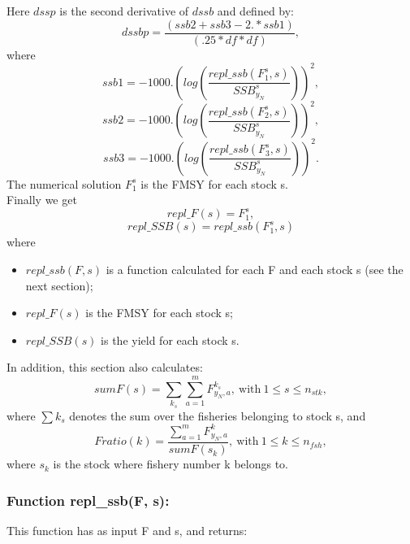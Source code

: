 \documentclass{article}
\begin{document}
Here $dssp$ is the second derivative of $dssb$ and defined by:
\begin{equation}
    dssbp  = \dfrac{(ssb2 + ssb3 - 2.*ssb1)}{(.25*df*df)},
\end{equation}
where
\begin{equation}
    ssb1=-1000.\left(log\left(\dfrac{repl\_ssb(F_1^s,s)}{SSB^s_{y_N}}\right)\right)^2,
\end{equation}
\begin{equation}
    ssb2=-1000.\left(log\left(\dfrac{repl\_ssb(F_2^s,s)}{SSB^s_{y_N}}\right)\right)^2,
\end{equation}
\begin{equation}
    ssb3=-1000.\left(log\left(\dfrac{repl\_ssb(F_3^s,s)}{SSB^s_{y_N}}\right)\right)^2.
\end{equation}
The numerical solution $F_1^s$ is the  FMSY for each stock s.\\
Finally we get
\begin{equation}
    repl\_F(s) = F_1^s,
\end{equation}
\begin{equation}
    repl\_SSB(s) = repl\_ssb(F_1^s,s)
\end{equation}
where
\begin{itemize}
    \item $repl\_ssb(F,s)$ is a function calculated for each F and each stock s  (see the next section);
    \item $repl\_F(s)$ is the FMSY for each stock s;
    \item $repl\_SSB(s)$ is the yield for each stock s.
\end{itemize}

In addition, this section also calculates:
\begin{equation}
    sumF(s)=\sum_{k_s}\sum_{a=1}^m F^{k_s}_{y_N,a}, \  \text{with} \ 1\leq s \leq n_{stk},
\end{equation}
where $\sum k_s$ denotes the sum over the fisheries belonging to stock s, and
\begin{equation}
    Fratio(k)=\dfrac{\sum_{a=1}^mF^k_{y_N,a}}{sumF(s_k)}, \  \text{with} \ 1\leq k  \leq n_{fsh},
\end{equation}
where $s_k$ is the stock where fishery number k belongs to.

\subsubsection{Function repl\_ssb(F, s):}
This function has as input F and s, and returns:
\end{document}
